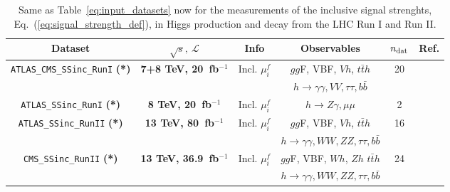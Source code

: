 
\begin{table}[t]
  \centering
  \scriptsize
   \renewcommand{\arraystretch}{1.65}
  \begin{tabular}{c|c|c|c|c|c}
 Dataset   &  $\sqrt{s},~\mathcal{L}$ & Info  &  Observables  & $n_{\rm dat}$ & Ref.   \\
    \toprule
    \multirow{2}{*}{ {\tt ATLAS\_CMS\_SSinc\_RunI} {\bf (*)}}  &\multirow{2}{*}{ {\bf 7+8 TeV, 20~fb$^{-1}$}}  &
    \multirow{2}{*}{Incl. $\mu_i^f$} &  $gg$F, VBF, $Vh$, $t\bar{t}h$
    &  \multirow{2}{*}{20}    &  \multirow{2}{*}{\cite{Khachatryan:2016vau} } \\
    &   &     & $h\to \gamma\gamma, VV, \tau\tau, b\bar{b}$   &  &    \\ \midrule
    {\tt ATLAS\_SSinc\_RunI} {\bf (*)}  & {\bf 8 TeV, 20~fb$^{-1}$}  &
    Incl. $\mu^f_i$ &  $h\to Z\gamma, \mu\mu$
    & 2    & \cite{Aad:2015gba} \\ \midrule
    \midrule
 \multirow{2}{*}{ {\tt ATLAS\_SSinc\_RunII} {\bf (*)}}  &\multirow{2}{*}{ {\bf 13 TeV, 80~fb$^{-1}$}}  &
 \multirow{2}{*}{Incl. $\mu_i^f$} &  $gg$F, VBF, $Vh$, $t\bar{t}h$
 &  \multirow{2}{*}{16}    &  \multirow{2}{*}{\cite{Aad:2019mbh} } \\
 &   &     & $h\to \gamma\gamma, WW, ZZ, \tau\tau, b\bar{b}$   &  &    \\ \midrule
 \multirow{2}{*}{ {\tt CMS\_SSinc\_RunII} {\bf (*)}}  &\multirow{2}{*}{ {\bf 13 TeV, 36.9~fb$^{-1}$}}  &
 \multirow{2}{*}{Incl. $\mu_i^f$} &  $gg$F, VBF, $Wh$, $Zh$ $t\bar{t}h$
 &  \multirow{2}{*}{24}    &  \multirow{2}{*}{\cite{Sirunyan:2018koj} } \\
 &   &     & $h\to \gamma\gamma, WW, ZZ, \tau\tau, b\bar{b}$   &  &    \\ 
    \bottomrule
    \end{tabular}
  \caption{\small Same as Table~\ref{eq:input_datasets} now for
    the  measurements of the inclusive
    signal strenghts, Eq.~(\ref{eq:signal_strength_def}),
    in Higgs production and decay from the LHC Run I and Run II.
     \label{eq:input_datasets_higgsSS}
  }
\end{table}

